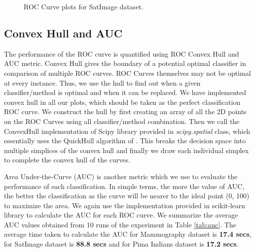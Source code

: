 \documentclass[10pt,journal,compsoc]{IEEEtran}
\begin{document}
\begin{figure}[!b]
\centering
{}
\hfil
{}
\hfil
\caption{ROC Curve plots for SatImage dataset.}
\label{fig:sat}
\end{figure}



\subsection{Convex Hull and AUC}

The performance of the ROC curve is quantified using ROC Convex Hull and AUC metric.
Convex Hull gives the boundary of a potential optimal classifier in comparison of multiple ROC curves.
ROC Curves themselves may not be optimal at every instance. 
Thus, we use the hull to find out when a given classifier/method is optimal and when it can be replaced.
We have implemented convex hull in all our plots, which should be taken as the perfect classification ROC curve.
We construct the hull by first creating an array of all the 2D points on the ROC Curves using all classifier/method combination.
Then we call the ConvexHull implementation of Scipy library \cite{scipy} provided in \textit{scipy.spatial} class, which essentially uses the QuickHull algorithm of \cite{qhull}\cite{pf01}.
This breaks the decision space into multiple simplices of the convex hull and finally we draw each individual simplex to complete the convex hull of the curves.

Area Under-the-Curve (AUC) is another metric which we use to evaluate the performance of each classification.
In simple terms, the more the value of AUC, the better the classification as the curve will be nearer to the ideal point (0, 100) to maximize the area.
We again use the implementation provided in scikit-learn library to calculate the AUC for each ROC curve.
We summarize the average AUC values obtained from 10 runs of the experiment in Table \ref{tab:auc}.
The average time taken to calculate the AUC for Mammography dataset is \textbf{17.4 secs}, for SatImage dataset is \textbf{88.8 secs} and for Pima Indians dataset is \textbf{17.2 secs}.
\end{document}
